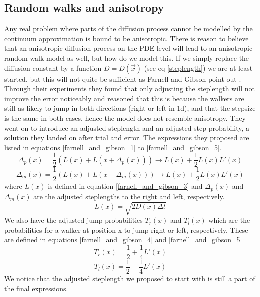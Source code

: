 \subsection{Random walks and anisotropy}\label{random_walks_and_anisotropy}

Any real problem where parts of the diffusion process cannot be modelled by the continuum approximation is bound to be anisotropic. 
There is reason to believe that an anisotropic diffusion process on the PDE level will lead to an anisotropic random walk model as well, but how do we model this. 
If we simply replace the diffusion constant by a function $D = D(\vec{x})$ (see eq \ref{steplength}) we are at least started, but this will not quite be sufficient as Farnell and Gibson point out \cite{farnell2005monte}. 
Through their experiments they found that only adjusting the steplength will not improve the error noticeably and reasoned that this is because the walkers are still as likely to jump in both directions (right or left in 1d), and that the stepsize is the same in both cases, hence the model does not resemble anisotropy. 
They went on to introduce an adjusted steplength and an adjusted step probability, a solution they landed on after trial and error. 
The expressions they proposed are listed in equations \ref{farnell_and_gibson_1} to \ref{farnell_and_gibson_5}. 
\begin{equation}\label{farnell_and_gibson_1}
 \Delta_p(x) = \frac{1}{2}\left(L(x) + L(x +\Delta_p(x))\right) \to L(x) +\frac{1}{2}L(x)L'(x)
\end{equation}
\begin{equation}\label{farnell_and_gibson_2}
 \Delta_m(x) = \frac{1}{2}\left(L(x) + L(x -\Delta_m(x))\right) \to L(x) +\frac{1}{2}L(x)L'(x)
\end{equation}
where $L(x)$ is defined in equation \ref{farnell_and_gibson_3} and $\Delta_p(x)$ and $\Delta_m(x)$ are the adjusted steplengths to the right and left, respectively.
\begin{equation}\label{farnell_and_gibson_3}
L(x) = \sqrt{2D(x)\Delta t}
\end{equation}
We also have the adjusted jump probabilities $T_r(x)$ and $T_l(x)$ which are the probabilities for a walker at position x to jump right or left, respectively. 
These are defined in equations \ref{farnell_and_gibson_4} and \ref{farnell_and_gibson_5}
\begin{equation}\label{farnell_and_gibson_4}
T_r(x) = \frac{1}{2} +\frac{1}{4}L'(x)
\end{equation}
\begin{equation}\label{farnell_and_gibson_5}
T_l(x) = \frac{1}{2} -\frac{1}{4}L'(x)
\end{equation}
We notice that the adjusted steplength we proposed to start with is still a part of the final expressions.


